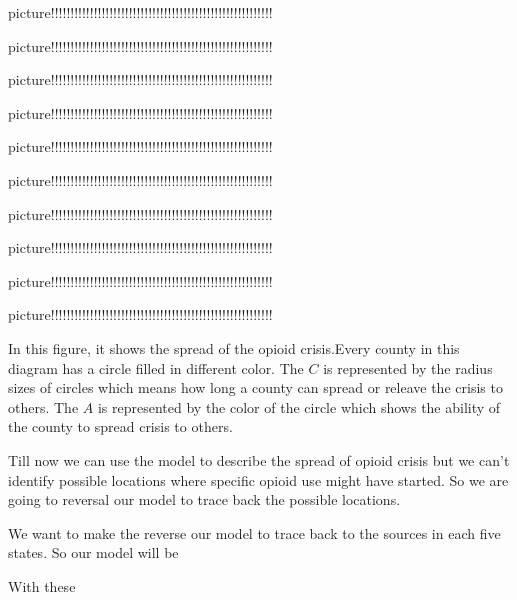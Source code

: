 \documentclass{mcmthesis}
\begin{document}
	\par picture!!!!!!!!!!!!!!!!!!!!!!!!!!!!!!!!!!!!!!!!!!!!!!!!!!!!!!!!!
	\par picture!!!!!!!!!!!!!!!!!!!!!!!!!!!!!!!!!!!!!!!!!!!!!!!!!!!!!!!!!
	\par picture!!!!!!!!!!!!!!!!!!!!!!!!!!!!!!!!!!!!!!!!!!!!!!!!!!!!!!!!!
	\par picture!!!!!!!!!!!!!!!!!!!!!!!!!!!!!!!!!!!!!!!!!!!!!!!!!!!!!!!!!
	\par picture!!!!!!!!!!!!!!!!!!!!!!!!!!!!!!!!!!!!!!!!!!!!!!!!!!!!!!!!!
	\par picture!!!!!!!!!!!!!!!!!!!!!!!!!!!!!!!!!!!!!!!!!!!!!!!!!!!!!!!!!
	\par picture!!!!!!!!!!!!!!!!!!!!!!!!!!!!!!!!!!!!!!!!!!!!!!!!!!!!!!!!!
	\par picture!!!!!!!!!!!!!!!!!!!!!!!!!!!!!!!!!!!!!!!!!!!!!!!!!!!!!!!!!
	\par picture!!!!!!!!!!!!!!!!!!!!!!!!!!!!!!!!!!!!!!!!!!!!!!!!!!!!!!!!!
	\par picture!!!!!!!!!!!!!!!!!!!!!!!!!!!!!!!!!!!!!!!!!!!!!!!!!!!!!!!!!

	\par In this figure, it shows the spread of the opioid crisis.Every county in this diagram has a circle filled in different color. The $C$ is represented by the radius sizes of circles which means how long a county can spread or releave the crisis to others. The $A$ is represented by the color of the circle which shows the ability of the county to spread crisis to others.
	\par Till now we can use the model to describe the spread of opioid crisis
	but we can't identify possible locations where specific opioid use might have started. So we are going to reversal our model to trace back the possible locations. 
	
	\par We want to make the reverse our model to trace back to the sources in each five states.
	So our model will be 
	\par With these 
	
	
	
\end{document}
